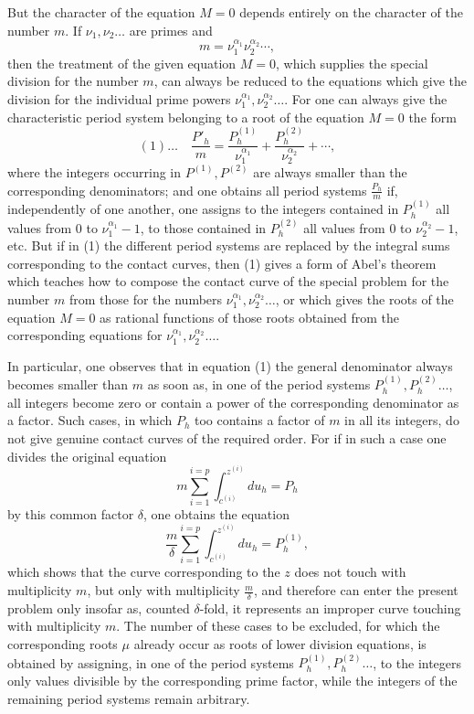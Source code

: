 \documentclass[10pt]{article}
\begin{document}
But the character of the equation \(M=0\) depends entirely on the character of the number \(m\). If \(\nu_1,\nu_2\ldots\) are primes and
\[
m=\nu_1^{\alpha_1}\nu_2^{\alpha_2}\cdots,
\]
then the treatment of the given equation \(M=0\), which supplies the special division for the number \(m\), can always be reduced to the equations which give the division for the individual prime powers \(\nu_1^{\alpha_1},\nu_2^{\alpha_2}\ldots\). For one can always give the characteristic period system belonging to a root of the equation \(M=0\) the form
\[
(1)\ldots\quad
\frac{P'_h}{m}
=
\frac{P_h^{(1)}}{\nu_1^{\alpha_1}}
+
\frac{P_h^{(2)}}{\nu_2^{\alpha_2}}
+\cdots,
\]
where the integers occurring in \(P^{(1)},P^{(2)}\) are always smaller than the corresponding denominators; and one obtains all period systems \(\frac{P_h}{m}\) if, independently of one another, one assigns to the integers contained in \(P_h^{(1)}\) all values from \(0\) to \(\nu_1^{\alpha_1}-1\), to those contained in \(P_h^{(2)}\) all values from \(0\) to \(\nu_2^{\alpha_2}-1\), etc. But if in (1) the different period systems are replaced by the integral sums corresponding to the contact curves, then (1) gives a form of Abel's theorem which teaches how to compose the contact curve of the special problem for the number \(m\) from those for the numbers \(\nu_1^{\alpha_1},\nu_2^{\alpha_2}\ldots\), or which gives the roots of the equation \(M=0\) as rational functions of those roots obtained from the corresponding equations for \(\nu_1^{\alpha_1},\nu_2^{\alpha_2}\ldots\).

In particular, one observes that in equation (1) the general denominator always becomes smaller than \(m\) as soon as, in one of the period systems \(P_h^{(1)},P_h^{(2)}\ldots\), all integers become zero or contain a power of the corresponding denominator as a factor. Such cases, in which \(P_h\) too contains a factor of \(m\) in all its integers, do not give genuine contact curves of the required order. For if in such a case one divides the original equation
\[
m\sum_{i=1}^{i=p}\int_{c^{(i)}}^{z^{(i)}}du_h=P_h
\]
by this common factor \(\delta\), one obtains the equation
\[
\frac{m}{\delta}\sum_{i=1}^{i=p}\int_{c^{(i)}}^{z^{(i)}}du_h=P_h^{(1)},
\]
which shows that the curve corresponding to the \(z\) does not touch with multiplicity \(m\), but only with multiplicity \(\frac{m}{\delta}\), and therefore can enter the present problem only insofar as, counted \(\delta\)-fold, it represents an improper curve touching with multiplicity \(m\). The number of these cases to be excluded, for which the corresponding roots \(\mu\) already occur as roots of lower division equations, is obtained by assigning, in one of the period systems \(P_h^{(1)},P_h^{(2)}\ldots\), to the integers only values divisible by the corresponding prime factor, while the integers of the remaining period systems remain arbitrary.
\end{document}
